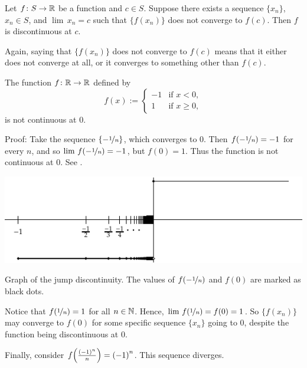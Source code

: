 \begin{prop}
Let $f \colon S \to {\mathbb{R}}$ be a function and $c \in S$.  Suppose 
there exists a sequence $\{ x_n \}$, $x_n \in S$, and $\lim\, x_n = c$
such that $\bigl\{ f(x_n) \bigr\}$ does not converge to $f(c)$.  Then $f$ is 
discontinuous at $c$.
\end{prop}

Again, 
saying that 
$\bigl\{ f(x_n) \bigr\}$ does not converge to $f(c)$
means that it
either does not converge
at all, or it converges to something
other than $f(c)$.

\begin{example} \label{example:jumpdiscont}
The function $f \colon {\mathbb{R}} \to {\mathbb{R}}$ defined by
\begin{equation*}
f(x) := 
\begin{cases}
-1 & \text{if } x < 0, \\
1 & \text{if } x \geq 0,
\end{cases}
\end{equation*}
is not continuous at 0.

Proof: Take the sequence $\{ - \nicefrac{1}{n} \}$, which converges to 0.  Then
$f(-\nicefrac{1}{n}) = -1$ for every $n$,
and so
$\lim\, f(-\nicefrac{1}{n}) = -1$, but $f(0) = 1$.  Thus the function is
not continuous at 0.  See
.

\begin{myfigureht}
\includegraphics{figures/jumpdiscont}
\caption{Graph of the jump discontinuity.  The values of
$f(-\nicefrac{1}{n})$ and $f(0)$ are marked as black dots.\label{fig:jumpdiscont}}
\end{myfigureht}

Notice that $f(\nicefrac{1}{n}) = 1$ for all $n \in {\mathbb{N}}$.
Hence, $\lim \, f(\nicefrac{1}{n}) = f(0) = 1$.  So
$\bigl\{ f(x_n) \bigr\}$ may converge to $f(0)$
for some specific
sequence $\{ x_n \}$ going to 0,
despite the function being discontinuous at 0.

Finally, consider $f\Bigl(\frac{{(-1)}^n}{n}\Bigr) = {(-1)}^n$.
This sequence diverges.
\end{example}

